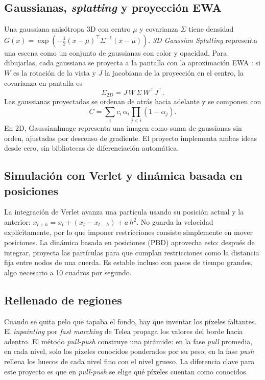 \subsection{Gaussianas, \emph{splatting} y proyección EWA}

Una gaussiana anisótropa 3D con centro $\mu$ y covarianza $\Sigma$ tiene densidad $G(x)=\exp\!\left(-\tfrac12(x-\mu)^\top\Sigma^{-1}(x-\mu)\right)$. \emph{3D Gaussian Splatting} \cite{kerbl2023} representa una escena como un conjunto de gaussianas con color y opacidad. Para dibujarlas, cada gaussiana se proyecta a la pantalla con la aproximación EWA \cite{zwicker2001}: si $W$ es la rotación de la vista y $J$ la jacobiana de la proyección en el centro, la covarianza en pantalla es
\begin{equation}
  \Sigma_{2D}=J\,W\,\Sigma\,W^\top J^\top.
\end{equation}
Las gaussianas proyectadas se ordenan de atrás hacia adelante y se componen con
\begin{equation}
  C=\sum_i c_i\,\alpha_i\prod_{j<i}(1-\alpha_j).
\end{equation}
En 2D, GaussianImage \cite{zhang2024} representa una imagen como suma de gaussianas sin orden, ajustadas por descenso de gradiente. El proyecto implementa ambas ideas desde cero, sin bibliotecas de diferenciación automática.

\subsection{Simulación con Verlet y dinámica basada en posiciones}

La integración de Verlet \cite{verlet1967} avanza una partícula usando su posición actual y la anterior: $x_{t+h}=x_t+(x_t-x_{t-h})+a\,h^2$. No guarda la velocidad explícitamente, por lo que imponer restricciones consiste simplemente en mover posiciones. La dinámica basada en posiciones (PBD) \cite{jakobsen2001,muller2007} aprovecha esto: después de integrar, proyecta las partículas para que cumplan restricciones como la distancia fija entre nodos de una cuerda. Es estable incluso con pasos de tiempo grandes, algo necesario a 10 cuadros por segundo.

\subsection{Rellenado de regiones}

Cuando se quita pelo que tapaba el fondo, hay que inventar los píxeles faltantes. El \emph{inpainting} por \emph{fast marching} de Telea \cite{telea2004} propaga los valores del borde hacia adentro. El método \emph{pull-push} \cite{gortler1996} construye una pirámide: en la fase \emph{pull} promedia, en cada nivel, solo los píxeles conocidos ponderados por su peso; en la fase \emph{push} rellena los huecos de cada nivel fino con el nivel grueso. La diferencia clave para este proyecto es que en \emph{pull-push} se elige qué píxeles cuentan como conocidos.

